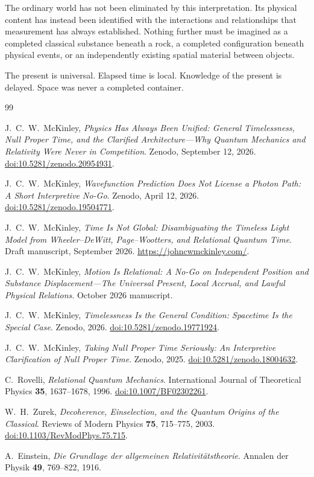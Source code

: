\documentclass[12pt,onecolumn]{article}
\begin{document}
The ordinary world has not been eliminated by this interpretation. Its physical content has instead been identified with the interactions and relationships that measurement has always established. Nothing further must be imagined as a completed classical substance beneath a rock, a completed configuration beneath physical events, or an independently existing spatial material between objects.

The present is universal. Elapsed time is local. Knowledge of the present is delayed. Space was never a completed container.

\clearpage

\begin{thebibliography}{99}

J.~C.~W.~McKinley,
\textit{Physics Has Always Been Unified: General Timelessness, Null Proper Time, and the Clarified Architecture---Why Quantum Mechanics and Relativity Were Never in Competition}.
Zenodo, September 12, 2026.
\href{https://doi.org/10.5281/zenodo.20954931}
{doi:10.5281/zenodo.20954931}.

J.~C.~W.~McKinley,
\textit{Wavefunction Prediction Does Not License a Photon Path: A Short Interpretive No-Go}.
Zenodo, April 12, 2026.
\href{https://doi.org/10.5281/zenodo.19504771}
{doi:10.5281/zenodo.19504771}.

J.~C.~W.~McKinley,
\textit{Time Is Not Global: Disambiguating the Timeless Light Model from Wheeler--DeWitt, Page--Wootters, and Relational Quantum Time}.
Draft manuscript, September 2026.
\url{https://johncwmckinley.com/}.

J.~C.~W.~McKinley,
\textit{Motion Is Relational: A No-Go on Independent Position and Substance Displacement---The Universal Present, Local Accrual, and Lawful Physical Relations}.
October 2026 manuscript.

J.~C.~W.~McKinley,
\textit{Timelessness Is the General Condition: Spacetime Is the Special Case}.
Zenodo, 2026.
\href{https://doi.org/10.5281/zenodo.19771924}
{doi:10.5281/zenodo.19771924}.

J.~C.~W.~McKinley,
\textit{Taking Null Proper Time Seriously: An Interpretive Clarification of Null Proper Time}.
Zenodo, 2025.
\href{https://doi.org/10.5281/zenodo.18004632}
{doi:10.5281/zenodo.18004632}.

C.~Rovelli,
\textit{Relational Quantum Mechanics}.
International Journal of Theoretical Physics
\textbf{35}, 1637--1678, 1996.
\href{https://doi.org/10.1007/BF02302261}
{doi:10.1007/BF02302261}.

W.~H.~Zurek,
\textit{Decoherence, Einselection, and the Quantum Origins of the Classical}.
Reviews of Modern Physics
\textbf{75}, 715--775, 2003.
\href{https://doi.org/10.1103/RevModPhys.75.715}
{doi:10.1103/RevModPhys.75.715}.

A.~Einstein,
\textit{Die Grundlage der allgemeinen Relativit{\"a}tstheorie}.
Annalen der Physik
\textbf{49}, 769--822, 1916.

\end{thebibliography}
\end{document}
